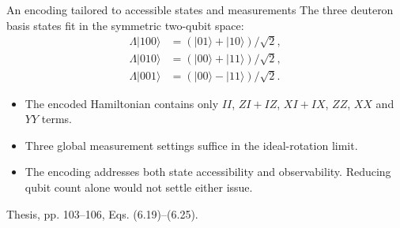 \documentclass[11pt,aspectratio=169]{beamer}
\newcommand{\ket}[1]{\lvert #1\rangle}
\newcommand{\src}[1]{\par\vfill{\fontsize{7}{8}\selectfont\color{gray}#1\par}}
\begin{document}
\begin{frame}{An encoding tailored to accessible states and measurements}
The three deuteron basis states fit in the symmetric two-qubit space:
\[
\begin{aligned}
\Lambda\ket{100}&=(\ket{01}+\ket{10})/\sqrt2,\\
\Lambda\ket{010}&=(\ket{00}+\ket{11})/\sqrt2,\\
\Lambda\ket{001}&=(\ket{00}-\ket{11})/\sqrt2.
\end{aligned}
\]
\begin{itemize}\setlength\itemsep{.6em}
\item The encoded Hamiltonian contains only $II$, $ZI+IZ$, $XI+IX$, $ZZ$, $XX$ and $YY$ terms.
\item Three global measurement settings suffice in the ideal-rotation limit.
\item The encoding addresses both state accessibility and observability. Reducing qubit count alone would not settle either issue.
\end{itemize}
\src{Thesis, pp. 103--106, Eqs. (6.19)--(6.25).}
\end{frame}
\end{document}
